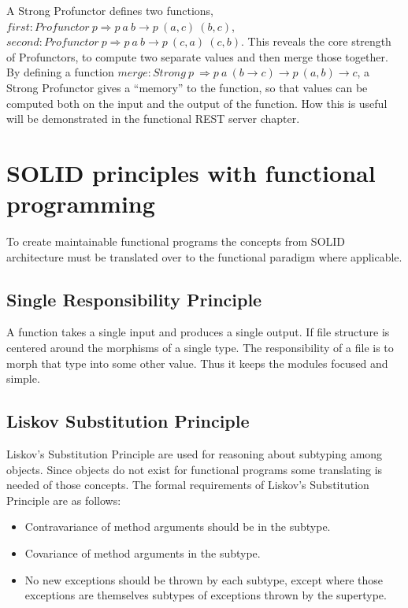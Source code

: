 A Strong Profunctor defines two functions, $first : Profunctor\ p \Rightarrow p\ a\ b\rightarrow p\ (a,c)\
(b,c)$, $second : Profunctor\ p \Rightarrow p\ a\ b\rightarrow p\ (c,a)\ (c,b)$. This reveals the core
strength of Profunctors, to compute two separate values and then merge those
together. By defining a function $merge : Strong\ p\ \Rightarrow p\ a\ (b
\rightarrow c) \rightarrow p\ (a,b) \rightarrow c$, a Strong Profunctor gives a
``memory'' to the function, so that values can be computed both on the input and
the output of the function. How this is useful will be demonstrated in the
functional REST server chapter.

\section{SOLID principles with functional programming}\label{dependencyinjection}

To create maintainable functional programs the concepts from SOLID architecture
must be translated over to the functional paradigm where applicable. 

\subsection{Single Responsibility Principle}

A function takes a single input and produces a single output. If file structure
is centered around the morphisms of a single type. The responsibility of a file
is to morph that type into some other value. Thus it keeps the modules focused
and simple.

\subsection{Liskov Substitution Principle}

Liskov's Substitution Principle are used for reasoning about subtyping among
objects. Since objects do not exist for functional programs some translating is
needed of those concepts. The formal requirements of Liskov's Substitution
Principle are as follows:

\begin{itemize}
    \item Contravariance of method arguments should be in the subtype.
    \item Covariance of method arguments in the subtype.
    \item No new exceptions should be thrown by each subtype, except where
        those exceptions are themselves subtypes of exceptions thrown by the
        supertype.
\end{itemize}

